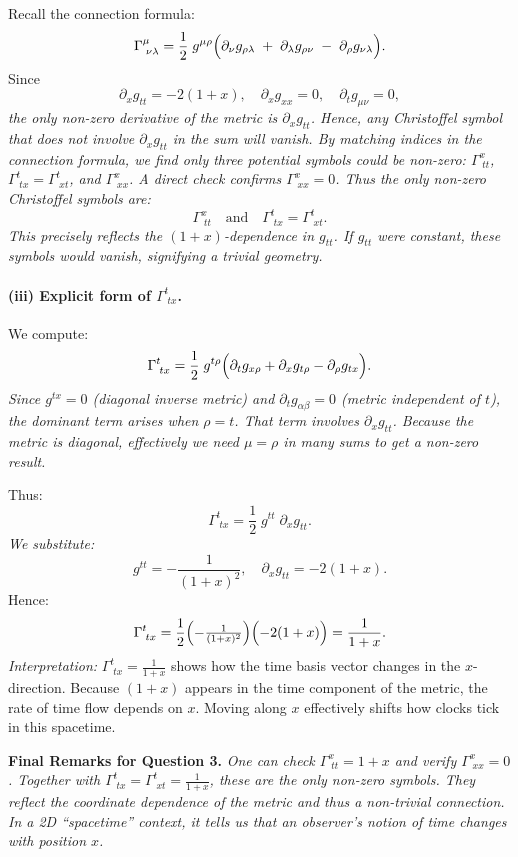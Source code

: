 Recall the connection formula:
\[
\Gamma^{\mu}_{\;\nu\lambda}
=
\frac{1}{2}\;g^{\mu\rho}
\Bigl(
\partial_\nu g_{\rho\lambda}
\;+\;
\partial_\lambda g_{\rho\nu}
\;-\;
\partial_\rho g_{\nu\lambda}
\Bigr).
\]
Since
\[
\partial_x g_{tt} = -2(1+x),
\quad
\partial_x g_{xx} = 0,
\quad
\partial_t g_{\mu\nu} = 0,
\]
\emph{the only non-zero derivative of the metric is \(\partial_x g_{tt}\). Hence, any Christoffel symbol that does not involve \(\partial_x g_{tt}\) in the sum will vanish. By matching indices in the connection formula, we find only three potential symbols could be non-zero: \(\Gamma^x_{\;tt}\), \(\Gamma^t_{\;tx} = \Gamma^t_{\;xt}\), and \(\Gamma^x_{\;xx}\). A direct check confirms \(\Gamma^x_{\;xx} = 0\). Thus the only non-zero Christoffel symbols are:}
\[
\Gamma^x_{\;tt}
\quad \text{and} \quad
\Gamma^t_{\;tx} = \Gamma^t_{\;xt}.
\]
\emph{This precisely reflects the \((1+x)\)-dependence in \(g_{tt}\). If \(g_{tt}\) were constant, these symbols would vanish, signifying a trivial geometry.}

\paragraph{(iii) Explicit form of \(\Gamma^{t}_{\;tx}\).}

We compute:
\[
\Gamma^{t}_{\;tx}
=
\frac{1}{2}\;g^{t\rho}
\Bigl(
\partial_t g_{x\rho}
+
\partial_x g_{t\rho}
-
\partial_\rho g_{tx}
\Bigr).
\]
\emph{Since \(g^{tx} = 0\) (diagonal inverse metric) and \(\partial_t g_{\alpha\beta} = 0\) (metric independent of \(t\)), the dominant term arises when \(\rho = t\). That term involves \(\partial_x g_{tt}\). Because the metric is diagonal, effectively we need \(\mu = \rho\) in many sums to get a non-zero result.}

Thus:
\[
\Gamma^{t}_{\;tx}
=
\frac{1}{2}\;g^{tt}\;\partial_x g_{tt}.
\]
\emph{We substitute:}
\[
g^{tt} = -\frac{1}{(1+x)^2},
\quad
\partial_x g_{tt} = -2(1+x).
\]
Hence:
\[
\Gamma^t_{\;tx}
=
\frac12
\Bigl(-\tfrac{1}{(1+x)^2}\Bigr)
\Bigl(-2(1+x)\Bigr)
=
\frac{1}{1+x}.
\]
\emph{Interpretation:}
\(\Gamma^{t}_{\;tx} = \frac{1}{1+x}\) shows how the time basis vector changes in the \(x\)-direction. Because \((1+x)\) appears in the time component of the metric, the rate of time flow depends on \(x\). Moving along \(x\) effectively shifts how clocks tick in this spacetime.

\bigskip

\textbf{Final Remarks for Question 3.}
\emph{One can check \(\Gamma^x_{\;tt} = 1 + x\) and verify \(\Gamma^x_{\;xx} = 0\). Together with \(\Gamma^t_{\;tx} = \Gamma^t_{\;xt} = \frac{1}{1+x}\), these are the only non-zero symbols. They reflect the coordinate dependence of the metric and thus a non-trivial connection. In a 2D “spacetime” context, it tells us that an observer’s notion of time changes with position \(x\).}


